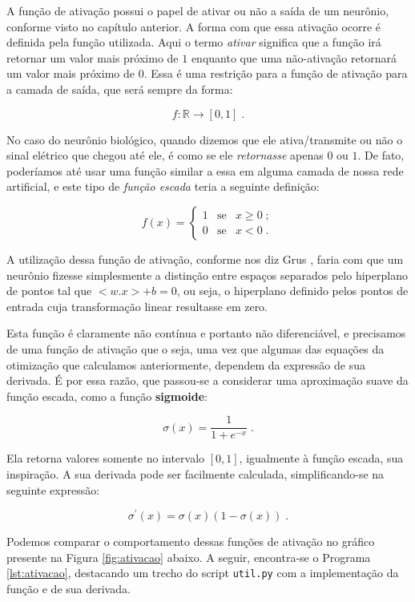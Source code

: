 A função de ativação possui o papel de ativar ou não a saída de um neurônio, conforme visto no capítulo anterior. A forma com que essa ativação ocorre é definida pela função utilizada. Aqui o termo \emph{ativar} significa que a função irá retornar um valor mais próximo de $1$ enquanto que uma não-ativação retornará um valor mais próximo de $0$. Essa é uma restrição para a função de ativação para a camada de saída, que será sempre da forma:

\[ f: \mathbb{R} \rightarrow [0, 1] \;. \]

No caso do neurônio biológico, quando dizemos que ele ativa/transmite ou não o sinal elétrico que chegou até ele, é como se ele \emph{retornasse} apenas $0$ ou $1$. De fato, poderíamos até usar uma função similar a essa em alguma camada de nossa rede artificial, e este tipo de \emph{função escada} teria a seguinte definição:

\[
f(x) = 
\left\{
\begin{array}{lcr}
1 & \text{se} & x \geq 0 \;;\\
0 & \text{se} & x < 0 \;.
\end{array}
\right.
\]

A utilização dessa função de ativação, conforme nos diz Grus \citep{data}, faria com que um neurônio fizesse simplesmente a distinção entre espaços separados pelo hiperplano de pontos tal que $ <w.x> + b = 0$, ou seja, o hiperplano definido pelos pontos de entrada cuja transformação linear resultasse em zero.

Esta função é claramente não contínua e portanto não diferenciável, e precisamos de uma função de ativação que o seja, uma vez que algumas das equações da otimização que calculamos anteriormente, dependem da expressão de sua derivada. É por essa razão, que passou-se a considerar uma aproximação suave da função escada, como a função \textbf{sigmoide}:

\[
\sigma(x) = \frac{1}{1 + e^{-x}} \;.
\]

Ela retorna valores somente no intervalo $[0, 1]$, igualmente à função escada, sua inspiração. A sua derivada pode ser facilmente calculada, simplificando-se na seguinte expressão:

\[
\sigma^{'}(x) = \sigma(x)(1-\sigma(x)) \;.
\]

Podemos comparar o comportamento dessas funções de ativação no gráfico presente na Figura \ref{fig:ativacao} abaixo. A seguir, encontra-se o Programa \ref{lst:ativacao}, destacando um trecho do script \texttt{util.py} com a implementação da função  e de sua derivada.

